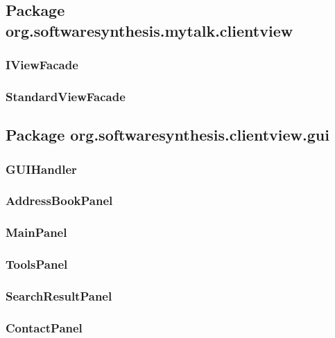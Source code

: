 \subsection{Package org.softwaresynthesis.mytalk.clientview}\label{sec:clientview}

\subsubsection{IViewFacade}\label{sec:iviewfacade}

\subsubsection{StandardViewFacade}\label{sec:standardviewfacade}

\subsection{Package org.softwaresynthesis.clientview.gui}\label{sec:gui}

\subsubsection{GUIHandler}\label{sec:guihandler}

\subsubsection{AddressBookPanel}\label{sec:addressbookpanel}

\subsubsection{MainPanel}\label{sec:mainpanel}

\subsubsection{ToolsPanel}\label{sec:toolspanel}

\subsubsection{SearchResultPanel}\label{sec:searchresultpanel}

\subsubsection{ContactPanel}\label{sec:contactpanel}

